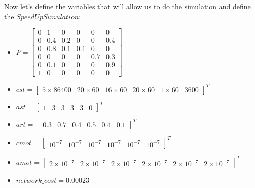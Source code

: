 Now let's define the variables that will allow us to do the simulation and define the $SpeedUpSimulation$:
\begin{itemize}
    \item \( P = \begin{bmatrix}
                0 & 1 & 0 & 0 & 0 & 0 \\ 
                0 & 0.4 & 0.2 & 0 & 0 & 0.4 \\ 
                0 & 0.8 & 0.1 & 0.1 & 0 & 0 \\ 
                0 & 0 & 0 & 0 & 0.7 & 0.3 \\
                0 & 0.1 & 0 & 0 & 0 & 0.9 \\ 
                1 & 0 & 0 & 0 & 0 & 0
            \end{bmatrix} \)
    
    
    \item \( cst = \begin{bmatrix} 5 \times 86400 & 20 \times 60 & 16 \times 60 & 20 \times 60 & 1 \times 60 & 3600 \end{bmatrix}^{T} \)
    
    \item \( ast = \begin{bmatrix} 1 & 3 & 3 & 3 & 3 & 0 \end{bmatrix}^{T} \) 
    
    \item \( art = \begin{bmatrix} 0.3 & 0.7 & 0.4 & 0.5 & 0.4 & 0.1 \end{bmatrix}^{T} \)
    
    \item \( cmot = \begin{bmatrix} 10^{-7} & 10^{-7} & 10^{-7} & 10^{-7} & 10^{-7} & 10^{-7} \end{bmatrix}^{T} \)
    
    \item \( amot = \begin{bmatrix} 2 \times 10^{-7} & 2 \times 10^{-7} & 2 \times 10^{-7} & 2 \times 10^{-7} & 2 \times 10^{-7} & 2 \times 10^{-7} \end{bmatrix}^{T} \)
    
    \item \( network\_cost = 0.00023 \)
    

\end{itemize}

